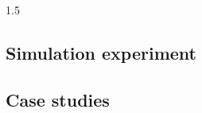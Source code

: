 \documentclass[11pt]{article}
\begin{document}
\begin{spacing}{1.5}
\subsection*{Simulation experiment}

\subsection*{Case studies}











\end{spacing}
\end{document}
